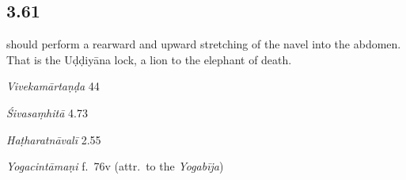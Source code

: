 \begin{ekdosis}

\subsection*{3.61}
\begin{translation} should perform a rearward and upward stretching of the navel into the abdomen. That is the Uḍḍiyāna lock, a lion to the elephant of death.
\end{translation}

\begin{sources}[hp03_061]
\emph{Vivekamārtaṇḍa} 44
\begin{versinnote}
\end{versinnote}

\emph{Śivasaṃhitā} 4.73
\begin{versinnote}
\end{versinnote}
\end{sources}

\begin{testimonia}[hp03_061]
\emph{Haṭharatnāvalī} 2.55
\begin{versinnote}
\end{versinnote}

\emph{Yogacintāmaṇi} f.~76v (attr.~to the \emph{Yogabīja})
\begin{versinnote}
\end{versinnote}


\end{testimonia}
\end{ekdosis}
